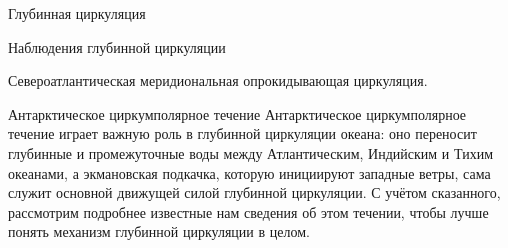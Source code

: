 \begin{chapter}{Глубинная циркуляция}
\begin{section}{Наблюдения глубинной циркуляции}
\begin{paragraph}{Североатлантическая меридиональная опрокидывающая циркуляция.}
\end{paragraph}
\end{section}

\begin{section}{Антарктическое циркумполярное течение}
%
%
%
%
Антарктическое циркумполярное течение играет важную роль в глубинной 
циркуляции океана: оно 
переносит
глубинные и промежуточные воды между Атлантическим, Индийским и Тихим океанами,
а экмановская подкачка, которую инициируют западные ветры, сама служит 
основной движущей силой глубинной циркуляции. С учётом сказанного, рассмотрим
подробнее известные нам сведения об этом течении, чтобы лучше понять механизм
глубинной циркуляции в целом.
%


\end{section}
\end{chapter}
